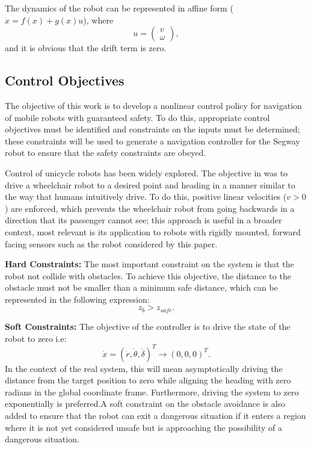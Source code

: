 \documentclass[conference]{IEEEtran}
\begin{document}
The dynamics of the robot can be represented in affine form ($\dot{x}=f(x)+g(x)u$), where \begin{equation}u=\left(\begin{matrix}
v\\\omega \end{matrix}\right),\end{equation} and it is obvious that the drift term is zero. 

\subsection{Control Objectives}
The objective of this work is to develop a nonlinear control policy for navigation of mobile robots with guaranteed safety. To do this, appropriate control objectives must be identified and constraints on the inputs must be determined; these constraints will be used to generate a navigation controller for the Segway robot to ensure that the safety constraints are obeyed.

Control of unicycle robots has been widely explored. The objective in \cite{park2011} was to drive a wheelchair robot to a desired point and heading in a manner similar to the way that humans intuitively drive. To do this, positive linear velocities ($v>0$) are enforced, which prevents the wheelchair robot from going backwards in a direction that its passenger cannot see; this approach is useful in a broader context, most relevant is its application to robots with rigidly mounted, forward facing sensors such as the robot considered by this paper.

\textbf{Hard Constraints:} The most important constraint on the system is that the robot not collide with obstacles. To achieve this objective, the distance to the obstacle must not be smaller than a minimum safe distance, which can be represented in the following expression:
\begin{equation}
z_b>z_{safe}.
\end{equation}

\textbf{Soft Constraints:} The objective of the controller is to drive the state of the robot to zero i.e:
\begin{equation} \dot{x}=(\dot{r},\dot{\theta},\dot{\delta})^T \to (0, 0, 0)^T. \end{equation}
In the context of the real system, this will mean asymptotically driving the distance from the target position to zero while aligning the heading with zero radians in the global coordinate frame. Furthermore, driving the system to zero exponentially is preferred.A soft constraint on the obstacle avoidance is also added to ensure that the robot can exit a dangerous situation if it enters a region where it is not yet considered unsafe but is approaching the possibility of a dangerous situation.
\end{document}
